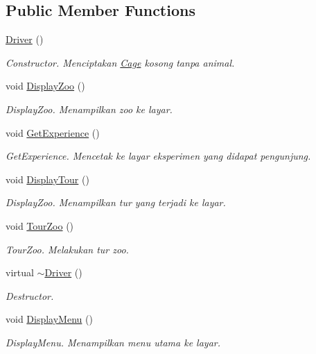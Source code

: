 \subsection*{Public Member Functions}
\begin{DoxyCompactItemize}
\item 
\hyperlink{classDriver_af0658d103e3e810a8e9ef0a53bb2e261}{Driver} ()
\begin{DoxyCompactList}\small\item\em Constructor. Menciptakan \hyperlink{classCage}{Cage} kosong tanpa animal. \end{DoxyCompactList}\item 
void \hyperlink{classDriver_aa8b4e139b99aad4720ce86286783dcdb}{Display\+Zoo} ()
\begin{DoxyCompactList}\small\item\em Display\+Zoo. Menampilkan zoo ke layar. \end{DoxyCompactList}\item 
void \hyperlink{classDriver_a2bc17a8251eab4cfdb7d74c7f7299c6e}{Get\+Experience} ()
\begin{DoxyCompactList}\small\item\em Get\+Experience. Mencetak ke layar eksperimen yang didapat pengunjung. \end{DoxyCompactList}\item 
void \hyperlink{classDriver_af3677b3b6adc2ccc5d486be1e4462fba}{Display\+Tour} ()
\begin{DoxyCompactList}\small\item\em Display\+Zoo. Menampilkan tur yang terjadi ke layar. \end{DoxyCompactList}\item 
void \hyperlink{classDriver_aa56ed0eaa789f78765708e15032d6534}{Tour\+Zoo} ()
\begin{DoxyCompactList}\small\item\em Tour\+Zoo. Melakukan tur zoo. \end{DoxyCompactList}\item 
virtual \hyperlink{classDriver_a2864fd05273f30e23aa959c92ef8a5b9}{$\sim$\+Driver} ()
\begin{DoxyCompactList}\small\item\em Destructor. \end{DoxyCompactList}\item 
void \hyperlink{classDriver_a56f5ca7386659854399999ffb6d8d043}{Display\+Menu} ()
\begin{DoxyCompactList}\small\item\em Display\+Menu. Menampilkan menu utama ke layar. \end{DoxyCompactList}\item 

\end{DoxyCompactItemize}
